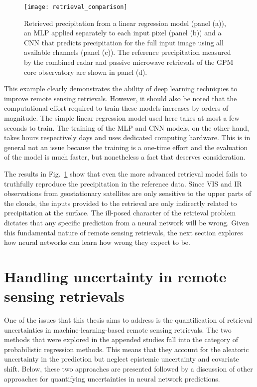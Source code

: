 \begin{figure}
  \centering
\texttt{[image: retrieval\_comparison]}
\caption{Retrieved precipitation from a linear regression model
  (panel (a)), an MLP applied separately to each input pixel
  (panel (b)) and a CNN that predicts precipitation for the
  full input image using all available channels (panel (c)).
  The reference precipitation measured by the combined radar
  and passive microwave retrievals of the GPM core observatory
  are shown in panel (d).}
\label{fig:machine_learning:retrieval_comparison}
\end{figure}

This example clearly demonstrates the ability of deep learning techniques to
improve remote sensing retrievals. However, it should also be noted that the
computational effort required to train these models increases by orders of
magnitude. The simple linear regression model used here takes at most a few
seconds to train. The training of the MLP and CNN models, on the other hand,
takes hours respectively days and uses dedicated computing hardware. This is in
general not an issue because the training is a one-time effort and the
evaluation of the model is much faster, but nonetheless a fact that deserves
consideration.

The results in Fig.~\ref{fig:machine_learning:retrieval_comparison} show that
even the more advanced retrieval model fails to truthfully reproduce the
precipitation in the reference data. Since VIS and IR observations from
geostationary satellites are only sensitive to the upper parts of the clouds,
the inputs provided to the retrieval are only indirectly related to
precipitation at the surface. The ill-posed character of the retrieval problem
dictates that any specific prediction from a neural network will be wrong. Given
this fundamental nature of remote sensing retrievals, the next section explores
how neural networks can learn how wrong they expect to be.


\section{Handling uncertainty in remote sensing retrievals}

One of the issues that this thesis aims to address is the quantification of
retrieval uncertainties in machine-learning-based remote sensing retrievals. The
two methods that were explored in the appended studies fall into the category of
probabilistic regression methods. This means that they account for the aleatoric
uncertainty in the prediction but neglect epistemic uncertainty and covariate
shift. Below, these two approaches are presented followed by a discussion of
other approaches for quantifying uncertainties in neural network predictions.

